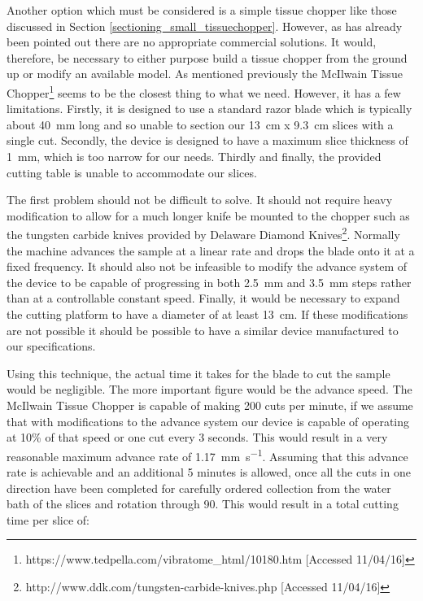 \documentclass[a4paper, 11pt]{article}
\numberwithin{equation}{section}
\begin{document}
	Another option which must be considered is a simple tissue chopper like those discussed in Section \ref{sectioning_small_tissuechopper}. However, as has already been pointed out there are no appropriate commercial solutions. It would, therefore, be necessary to either purpose build a tissue chopper from the ground up or modify an available model. As mentioned previously the  McIlwain Tissue Chopper\footnote{https://www.tedpella.com/vibratome\_html/10180.htm [Accessed 11/04/16]} seems to be the closest thing to what we need. However, it has a few limitations. Firstly, it is designed to use a standard razor blade which is typically about \SI{40}{\milli\meter} long and so unable to section our \SI{13}{\centi\meter} x \SI{9.3}{\centi\meter} slices with a single cut. Secondly, the device is designed to have a maximum slice thickness of \SI{1}{\milli\meter}, which is too narrow for our needs. Thirdly and finally, the provided cutting table is unable to accommodate our slices.
	
	The first problem should not be difficult to solve. It should not require heavy modification to allow for a much longer knife be mounted to the chopper such as the tungsten carbide knives provided by Delaware Diamond Knives\footnote{http://www.ddk.com/tungsten-carbide-knives.php [Accessed 11/04/16]}. Normally the machine advances the sample at a linear rate and drops the blade onto it at a fixed frequency. It should also not be infeasible to modify the advance system of the device to be capable of progressing in both \SI{2.5}{\milli\meter} and \SI{3.5}{\milli\meter} steps rather than at a controllable constant speed. Finally, it would be necessary to expand the cutting platform to have a diameter of at least \SI{13}{\centi\meter}. If these modifications are not possible it should be possible to have a similar device manufactured to our specifications.
	
	Using this technique, the actual time it takes for the blade to cut the sample would be negligible. The more important figure would be the advance speed. The McIlwain Tissue Chopper is capable of making 200 cuts per minute, if we assume that with modifications to the advance system our device is capable of operating at 10\% of that speed or one cut every 3 seconds. This would result in a very reasonable maximum advance rate of \SI{1.17}{\milli\meter\per\second}. Assuming that this advance rate is achievable and an additional 5 minutes is allowed, once all the cuts in one direction have been completed for carefully ordered collection from the water bath of the slices and rotation through 90\textdegree. This would result in a total cutting time per slice of:
	
\end{document}
